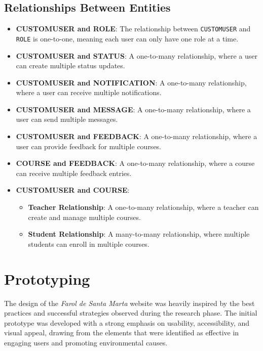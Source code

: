 \subsection{Relationships Between Entities}

\begin{itemize}
    \item \textbf{CUSTOMUSER and ROLE}: The relationship between \texttt{CUSTOMUSER} and \texttt{ROLE} is one-to-one, meaning each user can only have one role at a time.

    \item \textbf{CUSTOMUSER and STATUS}: A one-to-many relationship, where a user can create multiple status updates.

    \item \textbf{CUSTOMUSER and NOTIFICATION}: A one-to-many relationship, where a user can receive multiple notifications.

    \item \textbf{CUSTOMUSER and MESSAGE}: A one-to-many relationship, where a user can send multiple messages.

    \item \textbf{CUSTOMUSER and FEEDBACK}: A one-to-many relationship, where a user can provide feedback for multiple courses.

    \item \textbf{COURSE and FEEDBACK}: A one-to-many relationship, where a course can receive multiple feedback entries.

    \item \textbf{CUSTOMUSER and COURSE}:
    \begin{itemize}
        \item \textbf{Teacher Relationship}: A one-to-many relationship, where a teacher can create and manage multiple courses.
        \item \textbf{Student Relationship}: A many-to-many relationship, where multiple students can enroll in multiple courses.
    \end{itemize}
\end{itemize}

\section{Prototyping}

The design of the \textit{Farol de Santa Marta} website was heavily inspired by the best practices and successful strategies observed during the research phase. The initial prototype was developed with a strong emphasis on usability, accessibility, and visual appeal, drawing from the elements that were identified as effective in engaging users and promoting environmental causes.

